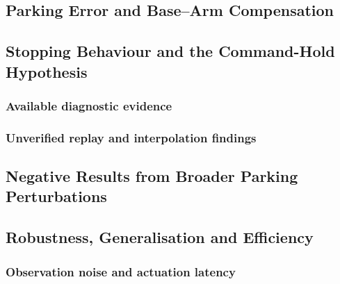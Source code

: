\documentclass[conference]{IEEEtran}
\begin{document}
\subsection{Parking Error and Base--Arm Compensation}
\subsection{Stopping Behaviour and the Command-Hold Hypothesis}
\subsubsection{Available diagnostic evidence}
\subsubsection{Unverified replay and interpolation findings}
\subsection{Negative Results from Broader Parking Perturbations}
\subsection{Robustness, Generalisation and Efficiency}
\subsubsection{Observation noise and actuation latency}
\end{document}

